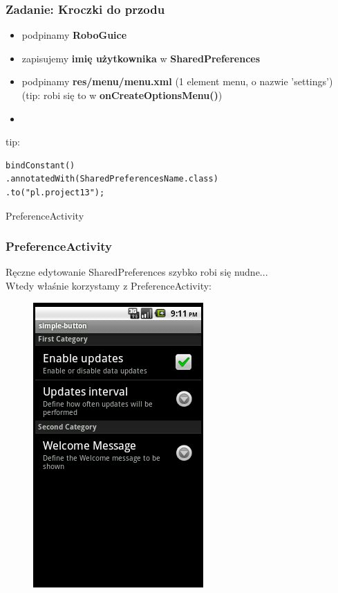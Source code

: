 \documentclass{beamer}
\begin{document}
\begin{frame}[fragile]\frametitle{Zadanie: Kroczki do przodu}
\begin{itemize}
 \item podpinamy \textbf{RoboGuice}
 \item zapisujemy \textbf{imię użytkownika} w \textbf{SharedPreferences}
 \item podpinamy \textbf{res/menu/menu.xml} (1 element menu, o nazwie 'settings') (tip: robi się to w \textbf{onCreateOptionsMenu()})
 \item 
\end{itemize} 

tip:
\begin{verbatim}
bindConstant()
.annotatedWith(SharedPreferencesName.class)
.to("pl.project13");
\end{verbatim}
\end{frame}

\begin{frame}
\begin{center}
 \Huge{PreferenceActivity}
\end{center}
\end{frame}

\begin{frame}\frametitle{PreferenceActivity}
\begin{center}
Ręczne edytowanie SharedPreferences szybko robi się nudne...\\
Wtedy właśnie korzystamy z PreferenceActivity:
 \begin{figure}
 \includegraphics{images/preference_activity}
 \end{figure}
\end{center}
\end{frame}
\end{document}
